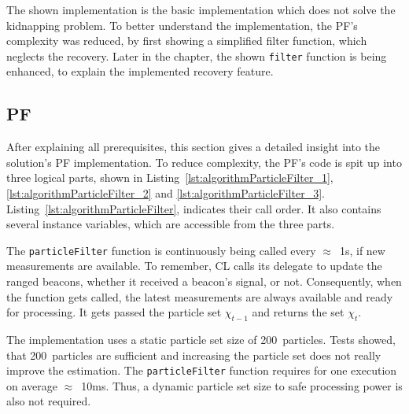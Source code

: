 The shown implementation is the basic implementation which does not solve the kidnapping problem. To better understand the implementation, the \acs{PF}'s complexity was reduced, by first showing a simplified filter function, which neglects the recovery. Later in the chapter, the shown \texttt{filter} function is being enhanced, to explain the implemented recovery feature.




\subsection{\acl{PF}}
After explaining all prerequisites, this section gives a detailed insight into the solution's \acl{PF} implementation. To reduce complexity, the \acs{PF}'s code is spit up into three logical parts, shown in Listing~\ref{lst:algorithmParticleFilter_1}, \ref{lst:algorithmParticleFilter_2} and \ref{lst:algorithmParticleFilter_3}. Listing~\ref{lst:algorithmParticleFilter}, indicates their call order. It also contains several instance variables, which are accessible from the three parts.

The \texttt{particleFilter} function is continuously being called every $\approx$~1s, if new measurements are available. To remember, \ac{CL} calls its delegate to update the ranged beacons, whether it received a beacon's signal, or not. Consequently, when the function gets called, the latest measurements are always available and ready for processing. It gets passed the particle set $\chi_{t-1}$ and returns the set $\chi_t$.

The implementation uses a static particle set size of 200~particles. Tests showed, that 200~particles are sufficient and increasing the particle set does not really improve the estimation. The \texttt{particleFilter} function requires for one execution on average $\approx$~10ms. Thus, a dynamic particle set size to safe processing power is also not required.




